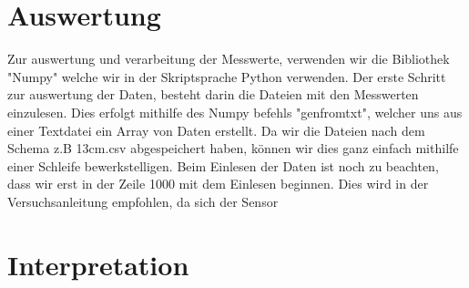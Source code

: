 \documentclass[TGAI_Laborbericht.tex]{subfiles}
\begin{document}
\section{Auswertung}
\label{chap:VERSUCH_1_AUSWERTUNG}
\begin{flushleft}
Zur auswertung und verarbeitung der Messwerte, verwenden wir die Bibliothek "Numpy" welche wir in der Skriptsprache Python verwenden. Der erste Schritt zur auswertung der Daten, besteht darin die Dateien mit den Messwerten einzulesen. Dies erfolgt mithilfe des Numpy befehls "genfromtxt", welcher uns aus einer Textdatei ein Array von Daten erstellt. Da wir die Dateien nach dem Schema z.B 13cm.csv abgespeichert haben, können wir dies ganz einfach mithilfe einer Schleife bewerkstelligen. Beim Einlesen der Daten ist noch zu beachten, dass wir erst in der Zeile 1000 mit dem Einlesen beginnen. Dies wird in der Versuchsanleitung empfohlen, da sich der Sensor
\end{flushleft}

\section{Interpretation}
\label{chap:VERSUCH_1_INTERPRETATION}
\end{document}
